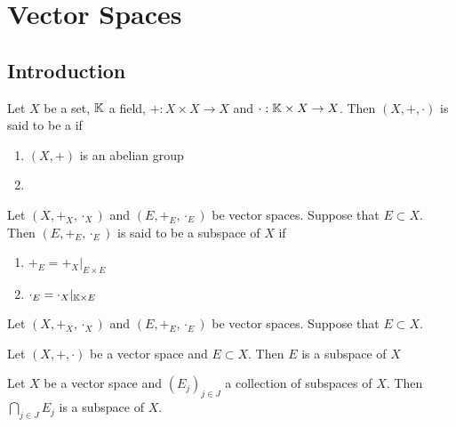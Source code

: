 \documentclass{book}
\begin{document}
\newpage
\chapter{Vector Spaces}

\section{Introduction}

\begin{defn}
	Let $X$ be a set, $\mathbb{K}$ a field, $+:X \times X \rightarrow X$ and $\cdot:\mathbb{K} \times X \rightarrow X$. Then $(X, +, \cdot)$ is said to be a  if 
	\begin{enumerate}
		\item $(X, +)$ is an abelian group
		\item 
	\end{enumerate} 
\end{defn}


\begin{defn}
	Let $(X, +_X, \cdot_X)$ and $(E, +_E, \cdot_E)$ be vector spaces. Suppose that $E \subset X$. Then $(E, +_E, \cdot_E)$ is said to be a subspace of $X$ if 
	\begin{enumerate}
		\item $+_E = +_X|_{E \times E}$
		\item $\cdot_E = \cdot_X|_{\mathbb{K} \times E}$
	\end{enumerate}
\end{defn}

\begin{ex}
	Let $(X, +_X, \cdot_X)$ and $(E, +_E, \cdot_E)$ be vector spaces. Suppose that $E \subset X$. 
\end{ex}

\begin{ex}
	Let $(X, +, \cdot)$ be a vector space and $E \subset X$. Then $E$ is a subspace of $X$
\end{ex}


\begin{defn}
	Let $X$ be a vector space and $(E_j)_{j \in J}$ a collection of subspaces of $X$. Then $\bigcap\limits_{j \in J}E_j$ is a subspace of $X$. 
\end{defn}
\end{document}
